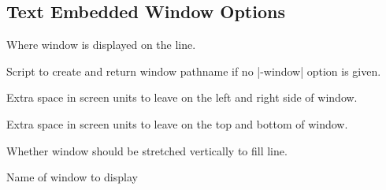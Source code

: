 \subsection*{Text Embedded Window Options}
\begin{enum}{1cm}

Where window is displayed on the line.

Script to create and return window pathname if no |-window| option is given.

Extra space in screen units to leave on the left and right side of window.

Extra space in screen units to leave on the top and bottom of window.

Whether window should be stretched vertically to fill line. 

Name of window to display

\end{enum}


